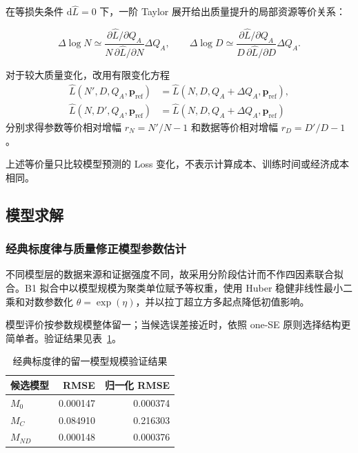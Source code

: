在等损失条件 $\mathrm d\widehat L=0$ 下，一阶 Taylor 展开给出质量提升的局部资源等价关系：

\begin{equation}
\Delta\log N
\simeq
\frac{
\partial\widehat L/\partial Q_A
}
{
N\,\partial\widehat L/\partial N
}
\Delta Q_A,
\qquad
\Delta\log D
\simeq
\frac{
\partial\widehat L/\partial Q_A
}
{
D\,\partial\widehat L/\partial D
}
\Delta Q_A.
\label{eq:p2_local_equivalence}
\end{equation}

对于较大质量变化，改用有限变化方程
\begin{align}
\widehat L(N',D,Q_A,\boldsymbol p_{\mathrm{ref}})
&=\widehat L(N,D,Q_A+\Delta Q_A,\boldsymbol p_{\mathrm{ref}}),\nonumber\\
\widehat L(N,D',Q_A,\boldsymbol p_{\mathrm{ref}})
&=\widehat L(N,D,Q_A+\Delta Q_A,\boldsymbol p_{\mathrm{ref}})
\label{eq:p2_finite_equivalence}
\end{align}
分别求得参数等价相对增幅 $r_N=N'/N-1$ 和数据等价相对增幅 $r_D=D'/D-1$。

上述等价量只比较模型预测的 Loss 变化，不表示计算成本、训练时间或经济成本相同。

\subsection{模型求解}

\subsubsection{经典标度律与质量修正模型参数估计}

不同模型层的数据来源和证据强度不同，故采用分阶段估计而不作四因素联合拟合。B1 拟合中以模型规模为聚类单位赋予等权重，使用 Huber 稳健非线性最小二乘和对数参数化 $\theta=\exp(\eta)$，并以拉丁超立方多起点降低初值影响。

模型评价按参数规模整体留一；当候选误差接近时，依照 one-SE 原则选择结构更简单者。验证结果见表~\ref{tab:p2_classic_cv}。

\begin{table}[!htbp]
\centering
\caption{经典标度律的留一模型规模验证结果}
\label{tab:p2_classic_cv}
\begin{tabular}{lrr}
\toprule
候选模型 & RMSE & 归一化 RMSE \\
\midrule
$M_0$ & 0.000147 & 0.000374 \\
$M_C$ & 0.084910 & 0.216303 \\
$M_{ND}$ & 0.000148 & 0.000376 \\
\bottomrule
\end{tabular}
\end{table}

